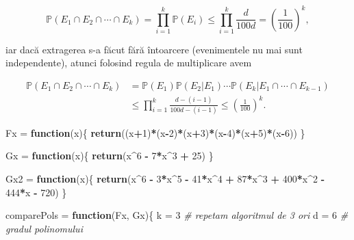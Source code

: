 \documentclass[]{article}
\newenvironment{Shaded}{\begin{snugshade}}{\end{snugshade}}
\newcommand{\KeywordTok}[1]{\textcolor[rgb]{0.13,0.29,0.53}{\textbf{#1}}}
\newcommand{\DecValTok}[1]{\textcolor[rgb]{0.00,0.00,0.81}{#1}}
\newcommand{\StringTok}[1]{\textcolor[rgb]{0.31,0.60,0.02}{#1}}
\newcommand{\CommentTok}[1]{\textcolor[rgb]{0.56,0.35,0.01}{\textit{#1}}}
\newcommand{\ControlFlowTok}[1]{\textcolor[rgb]{0.13,0.29,0.53}{\textbf{#1}}}
\newcommand{\OperatorTok}[1]{\textcolor[rgb]{0.81,0.36,0.00}{\textbf{#1}}}
\newcommand{\NormalTok}[1]{#1}
\begin{document}
\[
  \mathbb{P}(E_1\cap E_2\cap \cdots\cap E_k) = \prod_{i=1}^{k}\mathbb{P}(E_i)\leq\prod_{i=1}^{k}\frac{d}{100d} = \left(\frac{1}{100}\right)^k,
\]

iar dacă extragerea s-a făcut fără întoarcere (evenimentele nu mai sunt
independente), atunci folosind regula de multiplicare avem

\begin{align*}
  \mathbb{P}(E_1\cap E_2\cap \cdots\cap E_k) &= \mathbb{P}(E_1)\mathbb{P}(E_2|E_1)\cdots\mathbb{P}(E_k|E_1\cap\cdots\cap E_{k-1})\\
                    &\leq \prod_{i=1}^{k}\frac{d - (i-1)}{100d - (i-1)} \leq \left(\frac{1}{100}\right)^k.
\end{align*}

\begin{Shaded}
\begin{Highlighting}[]
\NormalTok{Fx =}\StringTok{ }\ControlFlowTok{function}\NormalTok{(x)\{}
  \KeywordTok{return}\NormalTok{((x}\OperatorTok{+}\DecValTok{1}\NormalTok{)}\OperatorTok{*}\NormalTok{(x}\OperatorTok{-}\DecValTok{2}\NormalTok{)}\OperatorTok{*}\NormalTok{(x}\OperatorTok{+}\DecValTok{3}\NormalTok{)}\OperatorTok{*}\NormalTok{(x}\OperatorTok{-}\DecValTok{4}\NormalTok{)}\OperatorTok{*}\NormalTok{(x}\OperatorTok{+}\DecValTok{5}\NormalTok{)}\OperatorTok{*}\NormalTok{(x}\OperatorTok{-}\DecValTok{6}\NormalTok{))}
\NormalTok{\}}

\NormalTok{Gx =}\StringTok{ }\ControlFlowTok{function}\NormalTok{(x)\{}
  \KeywordTok{return}\NormalTok{(x}\OperatorTok{^}\DecValTok{6} \OperatorTok{-}\StringTok{ }\DecValTok{7}\OperatorTok{*}\NormalTok{x}\OperatorTok{^}\DecValTok{3} \OperatorTok{+}\StringTok{ }\DecValTok{25}\NormalTok{)}
\NormalTok{\}}

\NormalTok{Gx2 =}\StringTok{ }\ControlFlowTok{function}\NormalTok{(x)\{}
  \KeywordTok{return}\NormalTok{(x}\OperatorTok{^}\DecValTok{6} \OperatorTok{-}\StringTok{ }\DecValTok{3}\OperatorTok{*}\NormalTok{x}\OperatorTok{^}\DecValTok{5} \OperatorTok{-}\StringTok{ }\DecValTok{41}\OperatorTok{*}\NormalTok{x}\OperatorTok{^}\DecValTok{4} \OperatorTok{+}\StringTok{ }\DecValTok{87}\OperatorTok{*}\NormalTok{x}\OperatorTok{^}\DecValTok{3} \OperatorTok{+}\StringTok{ }\DecValTok{400}\OperatorTok{*}\NormalTok{x}\OperatorTok{^}\DecValTok{2} \OperatorTok{-}\StringTok{ }\DecValTok{444}\OperatorTok{*}\NormalTok{x }\OperatorTok{-}\StringTok{ }\DecValTok{720}\NormalTok{)}
\NormalTok{\}}

\NormalTok{comparePols =}\StringTok{ }\ControlFlowTok{function}\NormalTok{(Fx, Gx)\{}
\NormalTok{  k =}\StringTok{ }\DecValTok{3} \CommentTok{# repetam algoritmul de 3 ori}
\NormalTok{  d =}\StringTok{ }\DecValTok{6} \CommentTok{# gradul polinomului }
  

\end{Highlighting}
\end{Shaded}
\end{document}
